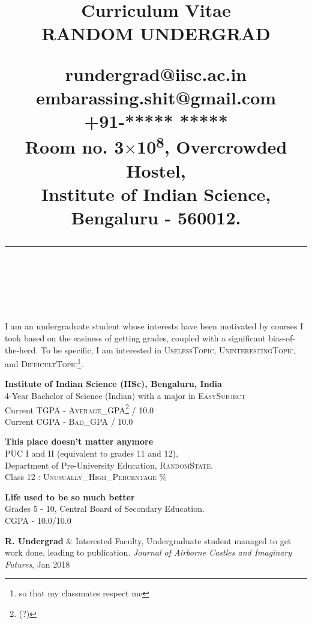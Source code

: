 \documentclass{article}
\title{
	\vspace{-1cm}
	\Large{Curriculum Vitae\\[3mm]}
	\Huge{RANDOM UNDERGRAD\\[3mm]}
	\begin{multicols}{2}
	\small{rundergrad@iisc.ac.in\\}
	\small{embarassing.shit@gmail.com\\}
	\small{+91-***** ***** \\[3mm]}
	\small{
		Room no. 3$\times$10\textsuperscript{8}, Overcrowded Hostel, \\
		Institute of Indian Science, \\ %
		Bengaluru - 560012. \\
	}
	\end{multicols}
	\vspace{-1cm}
	\rule{100mm}{0.25mm} \\[5mm]
}
\date{}
\author{}
\begin{document}
\maketitle
\vspace{-1.5cm}
\begin{addmargin}[0.75in]{0.75in}
	\reversemarginpar
	I am an undergraduate student whose interests have been motivated by courses I took based on the easiness of getting grades, coupled with a significant bias-of-the-herd. To be specific, I am interested in \textsc{UselessTopic, UninterestingTopic}, and \textsc{DifficultTopic}\footnote{so that my classmates respect me}.\\
\end{addmargin}
\begin{addmargin}[0.75in]{0.75in}
	\reversemarginpar
	\noindent
	\textbf{Institute of Indian Science (IISc), Bengaluru, India\\} \normalmarginpar {}
	4-Year Bachelor of Science (Indian) with a major in \textsc{EasySubject}\\
	Current TGPA - \textsc{Average\_GPA\footnote{(?)}} / 10.0\\
	Current CGPA - \textsc{Bad\_GPA} / 10.0

	\noindent
	\textbf{This place doesn't matter anymore\\} \normalmarginpar {}
	PUC I and II (equivalent to grades 11 and 12),\\ Department of Pre-University Education, \textsc{RandomState}.\\
	Class 12 : \textsc{Unusually\_High\_Percentage} \%
	
	\noindent
	\textbf{Life used to be so much better\\} \normalmarginpar {}
	Grades 5 - 10, Central Board of Secondary Education.\\
	CGPA - 10.0/10.0\\	
\end{addmargin}
\begin{addmargin}[0.75in]{0.75in}
	\reversemarginpar{}
	\noindent
	\textbf{R. Undergrad} \& Interested Faculty, Undergraduate student managed to get work done, leading to publication. \emph{Journal of Airborne Castles and Imaginary Futures}, Jan 2018\\
\end{addmargin}
\end{document}
